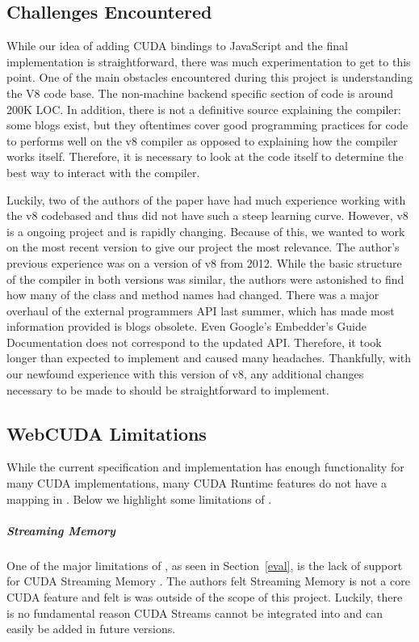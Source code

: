 
\subsection{Challenges Encountered}
\label{challenges}
While our idea of adding CUDA bindings to JavaScript and the final
implementation is straightforward, there was much experimentation to get to this point.
One of the main obstacles encountered during this project is understanding the
V8 code base. The non-machine backend specific section of code is around 200K
LOC. In addition, there is not a definitive source explaining the compiler: some
blogs exist, but they oftentimes cover good programming practices for code to
performs well on the v8 compiler as opposed to explaining how the compiler works
itself. Therefore, it is necessary to look at the code itself to determine the
best way to interact with the compiler.

Luckily, two of the authors of the paper have had much experience working with
the v8 codebased and thus did not have such a steep learning curve. However, v8
is a ongoing project and is rapidly changing. Because of this, we wanted to work
on the most recent version to give our project the most relevance. The author's
previous experience was on a version of v8 from 2012. While the basic structure
of the compiler in both versions was similar, the authors were astonished to
find how many of the class and method names had changed. There was a major
overhaul of the external programmers API last summer, which has made most
information provided is blogs obsolete. Even Google's Embedder's Guide
Documentation \cite{embeddersGuide} does not correspond to the updated API.
Therefore, it took longer than expected to implement \name and caused many
headaches. Thankfully, with our newfound experience with this version of v8, any
additional changes necessary to be made to \name should be straightforward to
implement.

\subsection{WebCUDA Limitations}
While the current \name specification and implementation has enough
functionality for many CUDA implementations, many CUDA Runtime features do not
have a mapping in \namens. Below we highlight some limitations of \namens.

\subparagraph{Streaming Memory}
 One of the major limitations of \namens, as seen in
Section~\ref{eval}, is the lack of support for CUDA Streaming Memory
\cite{cuStream}. The authors felt Streaming Memory is not a core
CUDA feature and felt is was outside of the scope of this project.
Luckily, there is no fundamental reason CUDA Streams cannot be integrated into 
\name and can easily be added in future versions.

